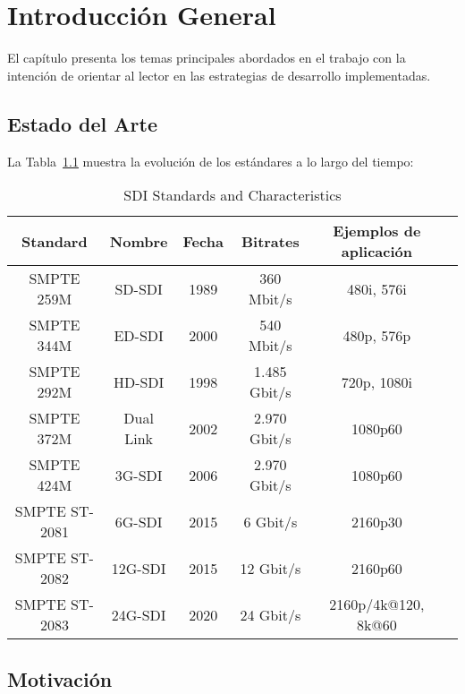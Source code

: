\chapter{Introducción General}\label{Chapter1}

El capítulo presenta los temas principales abordados en el trabajo con la
intención de orientar al lector en las estrategias de desarrollo
implementadas.

\section{Estado del Arte}

La Tabla~\ref{tab:sdi_standards} muestra la evolución de los estándares a lo largo del tiempo:

\begin{table}[h]
    \centering
    \begin{tabular}{cccccc}
        \toprule
        \textbf{Standard} & \textbf{Nombre} & \textbf{Fecha} & \textbf{Bitrates} & \textbf{Ejemplos de aplicación} \\
        \midrule
        SMPTE 259M      & SD-SDI    & 1989 & 360 Mbit/s     & 480i, 576i \\
        SMPTE 344M      & ED-SDI    & 2000 & 540 Mbit/s     & 480p, 576p \\
        SMPTE 292M      & HD-SDI    & 1998 & 1.485 Gbit/s   & 720p, 1080i \\
        SMPTE 372M      & Dual Link & 2002 & 2.970 Gbit/s   & 1080p60 \\
        SMPTE 424M      & 3G-SDI    & 2006 & 2.970 Gbit/s   & 1080p60 \\
        SMPTE ST-2081   & 6G-SDI    & 2015 & 6 Gbit/s       & 2160p30 \\
        SMPTE ST-2082   & 12G-SDI   & 2015 & 12 Gbit/s      & 2160p60 \\
        SMPTE ST-2083   & 24G-SDI   & 2020 & 24 Gbit/s      & 2160p/4k@120, 8k@60 \\
        \bottomrule
    \end{tabular}
    \caption{SDI Standards and Characteristics}\label{tab:sdi_standards}
\end{table}

\section{Motivación}

